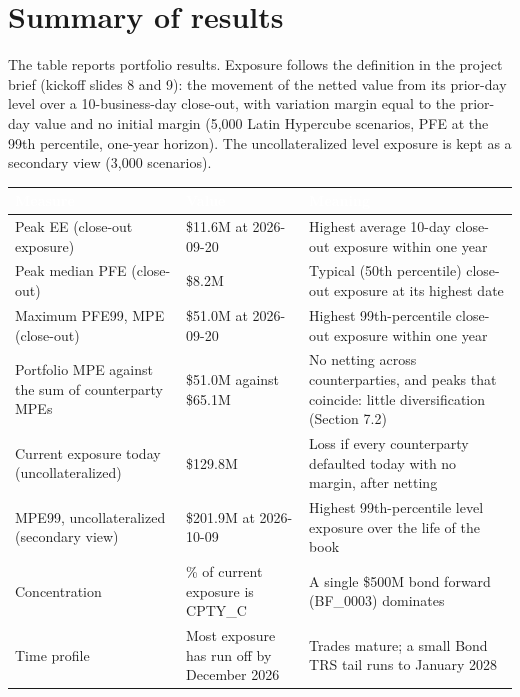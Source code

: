 \documentclass[11pt,letterpaper]{article}
\begin{document}
\tableofcontents
\clearpage
\section*{Summary of results}
The table reports portfolio results. Exposure follows the definition in the project brief (kickoff slides 8 and 9): the movement of the netted value from its prior-day level over a 10-business-day close-out, with variation margin equal to the prior-day value and no initial margin (5,000 Latin Hypercube scenarios, PFE at the 99th percentile, one-year horizon). The uncollateralized level exposure is kept as a secondary view (3,000 scenarios).

{\footnotesize\setlength{\LTpre}{4pt}\setlength{\LTpost}{6pt}
\begin{longtable}{>{\raggedright\arraybackslash}p{}>{\raggedright\arraybackslash}p{}>{\raggedright\arraybackslash}p{}}
\toprule
\rowcolor{navy}\textbf{\textcolor{white}{Measure}} & \textbf{\textcolor{white}{Value}} & \textbf{\textcolor{white}{Meaning}} \\
\endhead
Peak EE (close-out exposure) & \$11.6M at 2026-09-20 & Highest average 10-day close-out exposure within one year \\
\rowcolor{gray!9}Peak median PFE (close-out) & \$8.2M & Typical (50th percentile) close-out exposure at its highest date \\
Maximum PFE99, MPE (close-out) & \$51.0M at 2026-09-20 & Highest 99th-percentile close-out exposure within one year \\
\rowcolor{gray!9}Portfolio MPE against the sum of counterparty MPEs & \$51.0M against \$65.1M & No netting across counterparties, and peaks that coincide: little diversification (Section 7.2) \\
Current exposure today (uncollateralized) & \$129.8M & Loss if every counterparty defaulted today with no margin, after netting \\
\rowcolor{gray!9}MPE99, uncollateralized (secondary view) & \$201.9M at 2026-10-09 & Highest 99th-percentile level exposure over the life of the book \\
Concentration & 96\% of current exposure is CPTY\_C & A single \$500M bond forward (BF\_0003) dominates \\
\rowcolor{gray!9}Time profile & Most exposure has run off by December 2026 & Trades mature; a small Bond TRS tail runs to January 2028 \\

\end{longtable}}
\end{document}
